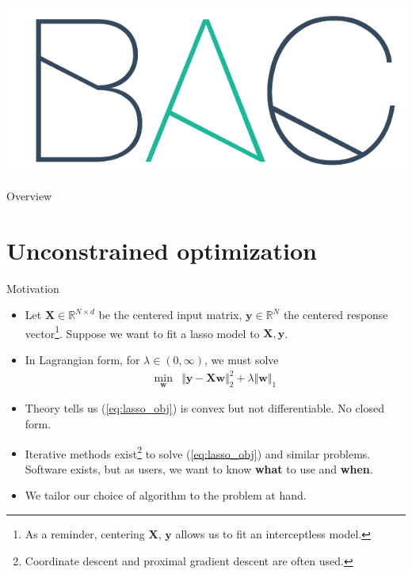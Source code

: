 \documentclass{beamer}
\title[\lecturetitle]{\lecturetitle}
\author[Derek Huang (BAC Advanced Team)]{Derek Huang}
\institute{BAC Advanced Team}
\date{May 29, 2021}
\numberwithin{equation}{section}
\newcommand{\aref}[1]{\alert{\ref{#1}}}
\begin{document}
\begin{frame}
    \titlepage
    \centering
    \includegraphics[scale = 0.1]{../bac_logo1.png}
\end{frame}

\begin{frame}{Overview}
    \tableofcontents
\end{frame}

\section{Unconstrained optimization}

\begin{frame}{Motivation}
    \begin{itemize}
        \item
        Let $ \mathbf{X} \in \mathbb{R}^{N \times d} $ be the centered input
        matrix, $ \mathbf{y} \in \mathbb{R}^N $ the centered response
        vector\footnote{
            As a reminder, centering $ \mathbf{X} $, $ \mathbf{y} $ allows us
            to fit an interceptless model.
        }.
        Suppose we want to fit a lasso model to $ \mathbf{X}, \mathbf{y} $.

        \item
        In Lagrangian form, for $ \lambda \in (0, \infty) $, we must solve
        \begin{equation} \label{eq:lasso_obj}
            \begin{array}{ll}
                \displaystyle\min_\mathbf{w} &
                \Vert\mathbf{y} - \mathbf{Xw}\Vert_2^2 +
                \lambda\Vert\mathbf{w}\Vert_1
            \end{array}
        \end{equation}

        \item
        Theory tells us (\aref{eq:lasso_obj}) is convex but not
        differentiable. No closed form.

        \item
        Iterative methods exist\footnote{
            Coordinate descent and proximal gradient descent are often used.
        } to solve (\aref{eq:lasso_obj}) and similar
        problems. Software exists, but as users, we want to know \textbf{what}
        to use and \textbf{when}.

        \item
        \alert{We tailor our choice of algorithm to the problem at hand.}
    \end{itemize}
\end{frame}
\end{document}
